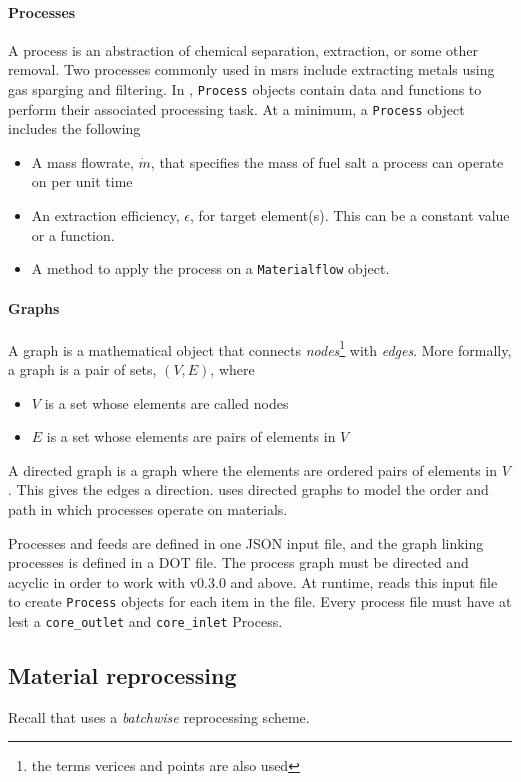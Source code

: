 \paragraph{Processes}
    A process is an abstraction of chemical separation, extraction, or some
    other removal. Two processes commonly used in \Gls{msr}s include
    extracting metals using gas sparging and filtering. In \SaltProc,
    \verb.Process. objects contain data and functions to perform their
    associated processing task. At a minimum, a \verb.Process. object includes
    the following
    \begin{itemize}
        \item A mass flowrate, $\dot{m}$, that specifies the mass of fuel salt a process can operate on per unit time
        \item An extraction efficiency, $\epsilon$, for target element(s). This can be a constant value or a function.
        \item A method to apply the process on a \verb.Materialflow. object. 
    \end{itemize}

\paragraph{Graphs}
    A graph is a mathematical object that connects {\it nodes}\footnote{the
    terms verices and points are also used} with {\it edges}. More formally,
    a graph is a pair of sets, $(V, E)$, where
    \begin{itemize}
        \item $V$ is a set whose elements are called nodes
        \item $E$ is a set whose elements are pairs of elements in $V$
    \end{itemize}
    A directed graph is a graph where the elements are ordered pairs of elements
    in $V$. This gives the edges a direction. \SaltProc uses directed graphs to
    model the order and path in which processes operate on materials.
        
Processes and feeds are defined in one JSON input file, and the graph linking
processes is defined in a DOT file. The process graph must be directed and
acyclic in order to work with \SaltProc v0.3.0 and above. At runtime,
\SaltProc reads this input file to create \verb.Process. objects for each item
in the file. Every process file must have at lest a \verb.core_outlet. and
\verb.core_inlet. Process.

\subsection{Material reprocessing}
Recall that \SaltProc uses a {\it batchwise} reprocessing scheme.

